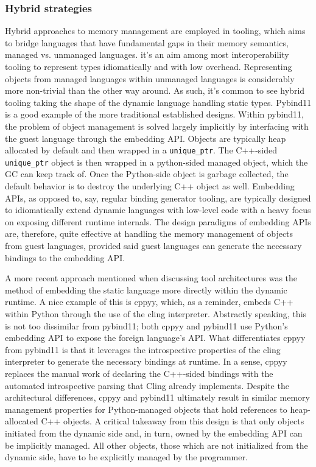 \subsubsection{Hybrid strategies}\label{s:hybrid_static_dynamic}

Hybrid approaches to memory management are employed in tooling, which aims to bridge languages that have fundamental gaps in their memory semantics, \ie managed vs. unmanaged languages. it's an aim among most interoperability tooling to represent types idiomatically and with low overhead. Representing objects from managed languages within unmanaged languages is considerably more non-trivial than the other way around. As such, it's common to see hybrid tooling taking the shape of the dynamic language handling static types. Pybind11 is a good example of the more traditional established designs. Within pybind11, the problem of object management is solved largely implicitly by interfacing with the guest language through the embedding API. Objects are typically heap allocated by default and then wrapped in a \texttt{unique\_ptr}. The C++-sided \texttt{unique\_ptr} object is then wrapped in a python-sided managed object, which the GC can keep track of. Once the Python-side object is garbage collected, the default behavior is to destroy the underlying C++ object as well. Embedding APIs, as opposed to, say, regular binding generator tooling, are typically designed to idiomatically extend dynamic languages with low-level code with a heavy focus on exposing different runtime internals. The design paradigms of embedding APIs are, therefore, quite effective at handling the memory management of objects from guest languages, provided said guest languages can generate the necessary bindings to the embedding API.

A more recent approach mentioned when discussing tool architectures was the method of embedding the static language more directly within the dynamic runtime. A nice example of this is cppyy, which, as a reminder, embeds C++ within Python through the use of the cling interpreter. Abstractly speaking, this is not too dissimilar from pybind11; both cppyy and pybind11 use Python's embedding API to expose the foreign language's API. What differentiates cppyy from pybind11 is that it leverages the introspective properties of the cling interpreter to generate the necessary bindings at runtime. In a sense, cppyy replaces the manual work of declaring the C++-sided bindings with the automated introspective parsing that Cling already implements. Despite the architectural differences, cppyy and pybind11 ultimately result in similar memory management properties for Python-managed objects that hold references to heap-allocated C++ objects. A critical takeaway from this design is that only objects initiated from the dynamic side and, in turn, owned by the embedding API can be implicitly managed. All other objects, \ie those which are not initialized from the dynamic side, have to be explicitly managed by the programmer.  

